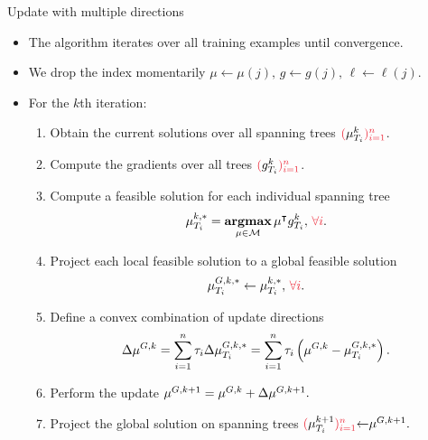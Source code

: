 \documentclass[first=dgreen,second=purple,logo=yellowexc]{aaltoslides}
\begin{document}
\begin{frame}{Update with multiple directions}
	\begin{itemize}\footnotesize
		\item The algorithm iterates over all training examples until convergence.
		\item We drop the index momentarily $\mu\leftarrow\mu(j),\,g\leftarrow g(j),\,\ell\leftarrow\ell(j)$.
		\item For the $k$th iteration:
		\begin{enumerate}\footnotesize
			\item Obtain the current solutions over all spanning trees ${\color{aaltored}(}\vmu_{T_i}^k{\color{aaltored})_{i=1}^n}$.
			\item Compute the gradients over all trees ${\color{aaltored}(}g_{T_i}^k{\color{aaltored})_{i=1}^n}$.
			\item Compute a feasible solution for each individual spanning tree
			\begin{align*}
				{\vmu}_{T_i}^{k,*} = \underset{\vmu\in\Mcal}{\argmax}\,\vmu\tp g_{T_i}^k,\,{\color{aaltored}\forall i}.
			\end{align*}
			\item Project each local feasible solution to a global feasible solution
			\begin{align*}
				{\vmu}_{T_i}^{G,k,*} \leftarrow {\vmu}_{T_i}^{k,*},\,{\color{aaltored}\forall i}.
			\end{align*}
			\item Define a convex combination of update directions 
			\begin{align*}
				\Delta{\mathbf {\mu}}^{G,k} = \sum_{i=1}^{n}\tau_i \Delta{\mathbf {\mu}}_{T_i}^{G,k,*} = \sum_{i=1}^{n}\tau_i \left({\mathbf {\mu}}^{G,k} -{\mathbf {\mu}}_{T_i}^{G,k,*}\right).
			\end{align*}
			\item Perform the update $\mathbf {\mu}^{G,k+1} = \mathbf {\mu}^{G,k} + \Delta{\mathbf {\mu}}^{G,k+1}.$
			\item Project the global solution on spanning trees ${\color{aaltored}(}\vmu_{T_i}^{k+1}{\color{aaltored})_{i=1}^n}{\leftarrow}\vmu^{G,k+1}.$
		\end{enumerate}
	\end{itemize}
\end{frame}
\end{document}

